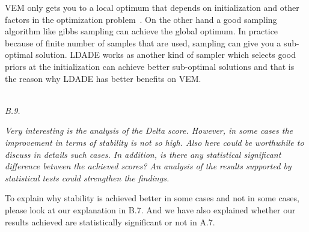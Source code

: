 \documentclass[conference]{IEEEtran}
\begin{document}
VEM only gets you to a local optimum that depends on initialization and other factors in the optimization problem~\cite{asuncion2009smoothing}. On the other hand a good sampling algorithm like gibbs sampling can achieve the global optimum. In practice because of finite number of samples that are used, sampling can give you a sub-optimal solution. LDADE works as another kind of sampler which selects good priors at the initialization can achieve better sub-optimal solutions and that is the reason why LDADE has better benefits on VEM.

\noindent
\textit{\\B.9.} 

\textit{Very interesting is the analysis of the Delta score. However, in some cases the improvement in terms of stability is not so high. Also here could be worthwhile to discuss in details such cases. In addition, is there any statistical significant difference between the achieved scores? An analysis of the results supported by statistical tests could strengthen the findings.\\}

To explain why stability is achieved better in some cases and not in some cases, please look at our explanation in B.7. And we have also explained whether our results achieved are statistically significant or not in A.7.


\medskip

\end{document}
